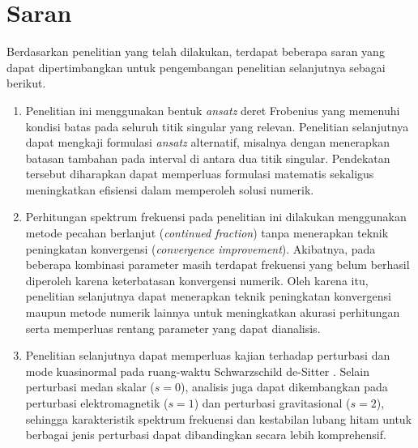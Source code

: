 \section{Saran}

Berdasarkan penelitian yang telah dilakukan, terdapat beberapa saran yang dapat dipertimbangkan untuk pengembangan penelitian selanjutnya sebagai berikut.

\begin{enumerate}

\item Penelitian ini menggunakan bentuk \textit{ansatz} deret Frobenius yang memenuhi kondisi batas pada seluruh titik singular yang relevan. Penelitian selanjutnya dapat mengkaji formulasi \textit{ansatz} alternatif, misalnya dengan menerapkan batasan tambahan pada interval di antara dua titik singular. Pendekatan tersebut diharapkan dapat memperluas formulasi matematis sekaligus meningkatkan efisiensi dalam memperoleh solusi numerik.

\item Perhitungan spektrum frekuensi pada penelitian ini dilakukan menggunakan metode pecahan berlanjut (\textit{continued fraction}) tanpa menerapkan teknik peningkatan konvergensi (\textit{convergence improvement}). Akibatnya, pada beberapa kombinasi parameter masih terdapat frekuensi yang belum berhasil diperoleh karena keterbatasan konvergensi numerik. Oleh karena itu, penelitian selanjutnya dapat menerapkan teknik peningkatan konvergensi maupun metode numerik lainnya untuk meningkatkan akurasi perhitungan serta memperluas rentang parameter yang dapat dianalisis.

\item Penelitian selanjutnya dapat memperluas kajian terhadap perturbasi dan mode kuasinormal pada ruang-waktu Schwarzschild de-Sitter \parencite{MossNorman2002}. Selain perturbasi medan skalar ($s=0$), analisis juga dapat dikembangkan pada perturbasi elektromagnetik ($s=1$) dan perturbasi gravitasional ($s=2$), sehingga karakteristik spektrum frekuensi dan kestabilan lubang hitam untuk berbagai jenis perturbasi dapat dibandingkan secara lebih komprehensif.

\end{enumerate}